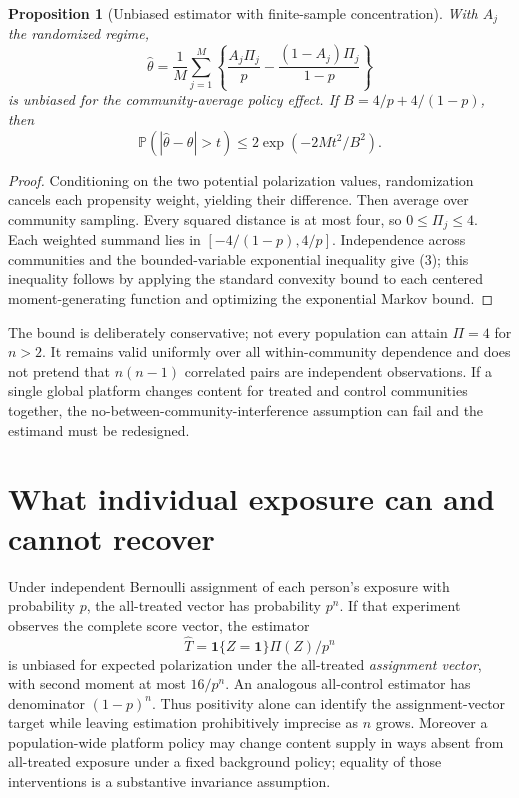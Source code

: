 \documentclass[11pt,a4paper]{article}
\newtheorem{proposition}[theorem]{Proposition}
\newcommand{\Prob}{\mathbb P}
\newcommand{\ind}{\mathbf 1}
\begin{document}
\begin{proposition}[Unbiased estimator with finite-sample concentration]
With $A_j$ the randomized regime,
\[
 \widehat\theta=\frac1M\sum_{j=1}^M
 \left\{\frac{A_j\Pi_j}{p}-\frac{(1-A_j)\Pi_j}{1-p}\right\}
\]
is unbiased for the community-average policy effect. If
$B=4/p+4/(1-p)$, then
\[
 \Prob(|\widehat\theta-\theta|>t)
 \le2\exp(-2Mt^2/B^2).                                   \tag{3}
\]
\end{proposition}
\begin{proof}
Conditioning on the two potential polarization values, randomization cancels each propensity weight, yielding their difference. Then average over community sampling. Every squared distance is at most four, so $0\le\Pi_j\le4$. Each weighted summand lies in $[-4/(1-p),4/p]$. Independence across communities and the bounded-variable exponential inequality give (3); this inequality follows by applying the standard convexity bound to each centered moment-generating function and optimizing the exponential Markov bound.
\end{proof}

The bound is deliberately conservative; not every population can attain $\Pi=4$ for $n>2$. It remains valid uniformly over all within-community dependence and does not pretend that $n(n-1)$ correlated pairs are independent observations. If a single global platform changes content for treated and control communities together, the no-between-community-interference assumption can fail and the estimand must be redesigned.

\section{What individual exposure can and cannot recover}
Under independent Bernoulli assignment of each person's exposure with probability $p$, the all-treated vector has probability $p^n$. If that experiment observes the complete score vector, the estimator
\[
 \widehat T=\ind\{Z=\mathbf1\}\Pi(Z)/p^n
\]
is unbiased for expected polarization under the all-treated \emph{assignment vector}, with second moment at most $16/p^n$. An analogous all-control estimator has denominator $(1-p)^n$. Thus positivity alone can identify the assignment-vector target while leaving estimation prohibitively imprecise as $n$ grows. Moreover a population-wide platform policy may change content supply in ways absent from all-treated exposure under a fixed background policy; equality of those interventions is a substantive invariance assumption.
\end{document}
